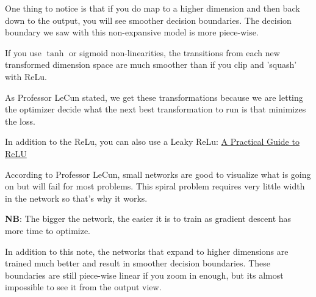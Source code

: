 One thing to notice is that if you do map to a higher dimension and then back down to the output, you will see smoother decision boundaries. 
The decision boundary we saw with this non-expansive model is more piece-wise.

If you use $\tanh$ or sigmoid non-linearities, the transitions from each new transformed dimension space are much smoother than if you clip and 'squash' with ReLu. 

As Professor LeCun stated, we get these transformations because we are letting the optimizer decide what the next best transformation to run is that minimizes the loss. 

\noindent{}

\noindent{}

In addition to the ReLu, you can also use a Leaky ReLu: 
\href{https://medium.com/tinymind/a-practical-guide-to-relu-b83ca804f1f7}{A Practical Guide to ReLU}

According to Professor LeCun, small networks are good to visualize what is going on but will fail for most problems. 
This spiral problem requires very little width in the network so that's why it works. 

\textbf{NB}: The bigger the network, the easier it is to train as gradient descent has more time to optimize.

In addition to this note, the networks that expand to higher dimensions are trained much better and result in smoother decision boundaries. 
These boundaries are still piece-wise linear if you zoom in enough, but its almost impossible to see it from the output view. 